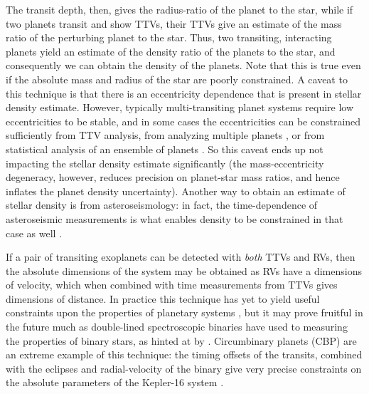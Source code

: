 \documentclass[graybox,natbib,nosecnum]{svmult}
\begin{document}
The transit depth, then, gives the radius-ratio of the planet to the star, while if two planets
transit and show TTVs, their TTVs give an estimate of the mass ratio of the perturbing planet
to the star.  Thus, two transiting, interacting planets yield an estimate of the density ratio of
the planets to the star, and consequently we can obtain the density of the planets.
Note that this is true even if the absolute mass and radius of the star are poorly
constrained.  A caveat to this technique is that there is an eccentricity dependence that 
is present in stellar density estimate.  However, typically multi-transiting planet systems require low eccentricities to be stable,
and in some cases the eccentricities can be constrained sufficiently from TTV analysis, from
analyzing multiple planets \citep{2014MNRAS.440.2164K}, or
from statistical analysis of an ensemble of planets \citep{2014ApJ...787...80H}.  So this caveat ends up not impacting the stellar density 
estimate significantly (the mass-eccentricity degeneracy, however, reduces precision on planet-star mass ratios, and hence inflates the planet density uncertainty). 
Another way to obtain an estimate of stellar density is from asteroseismology:
in fact, the time-dependence of asteroseismic measurements is what enables density
to be constrained in that case as well \citep{1986ApJ...306L..37U}.

If a pair of transiting exoplanets can be detected with {\it both} TTVs and RVs, then the
absolute dimensions of the system may be obtained \citep{2005MNRAS.359..567A,
2013ApJ...762..112M} as RVs have a dimensions of velocity, which 
when combined with time measurements from TTVs gives dimensions of distance.
In practice this technique has yet to yield useful constraints upon the properties
of planetary systems \citep{2015MNRAS.453.2644A}, but it may prove fruitful
in the future much as double-lined spectroscopic binaries have used to measuring 
the properties of binary stars, as hinted at by \cite{2016A&A...595L...5A}.  Circumbinary planets 
(CBP) are an extreme example of this technique: the timing offsets of the transits, combined with the eclipses
and radial-velocity of the binary give very precise constraints on the absolute parameters
of the Kepler-16 system \citep{2011Sci...333.1602D}.

\end{document}
